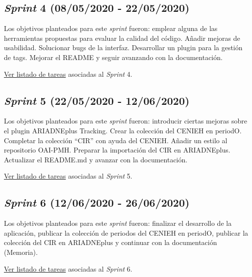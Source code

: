 

\subsection{\emph{Sprint} 4 (08/05/2020 - 22/05/2020)}

Los objetivos planteados para este \emph{sprint} fueron: emplear alguna
de las herramientas propuestas para evaluar la calidad del código.
Añadir mejoras de usabilidad. Solucionar bugs de la interfaz.
Desarrollar un plugin para la gestión de tags. Mejorar el README y
seguir avanzando con la documentación.

\href{https://github.com/gcm1001/TFG-CeniehAriadne/milestone/5}{Ver
listado de tareas} asociadas al \emph{Sprint} 4.



\subsection{\emph{Sprint} 5 (22/05/2020 - 12/06/2020)}

Los objetivos planteados para este \emph{sprint} fueron: introducir
ciertas mejoras sobre el plugin ARIADNEplus Tracking. Crear la colección
del CENIEH en periodO. Completar la colección ``CIR'' con ayuda del
CENIEH. Añadir un estilo al repositorio OAI-PMH. Preparar la importación
del CIR en ARIADNEplus. Actualizar el README.md y avanzar con la
documentación.

\href{https://github.com/gcm1001/TFG-CeniehAriadne/milestone/6}{Ver
listado de tareas} asociadas al \emph{Sprint} 5.


\subsection{\emph{Sprint} 6 (12/06/2020 - 26/06/2020)}

Los objetivos planteados para este \emph{sprint} fueron: finalizar el
desarrollo de la aplicación, publicar la colección de periodos del
CENIEH en periodO, publicar la colección del CIR en ARIADNEplus y
continuar con la documentación (Memoria).

\href{https://github.com/gcm1001/TFG-CeniehAriadne/milestone/7}{Ver
listado de tareas} asociadas al \emph{Sprint} 6.


